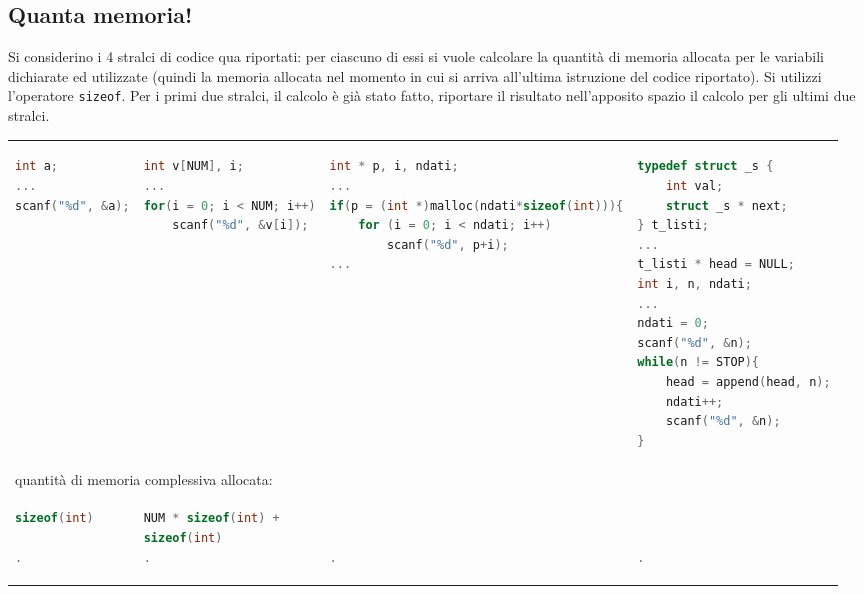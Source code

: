 \subsection{Quanta memoria!}
 Si considerino i 4 stralci di codice qua riportati: per ciascuno di essi si vuole calcolare la quantit\`a di memoria allocata per le variabili dichiarate ed utilizzate (quindi la memoria allocata nel momento in cui si arriva all'ultima istruzione del codice riportato). Si utilizzi l'operatore \texttt{sizeof}. Per i primi due stralci, il calcolo \`e gi\`a stato fatto, riportare il risultato nell'apposito spazio il calcolo per gli ultimi due stralci.

\small
\begin{tabular}{p{2.5cm}p{3.8cm}p{6.5cm}p{4.2cm}}
\begin{lstlisting}[language=c, tabsize=1]
int a;
...
scanf("%d", &a);
\end{lstlisting} &
\begin{lstlisting}[language=c, tabsize=1]
int v[NUM], i;
...
for(i = 0; i < NUM; i++)
	scanf("%d", &v[i]);
\end{lstlisting} &
\begin{lstlisting}[language=c, tabsize=1]
int * p, i, ndati;
...
if(p = (int *)malloc(ndati*sizeof(int))){
	for (i = 0; i < ndati; i++)
		scanf("%d", p+i);
...
\end{lstlisting} &
\begin{lstlisting}[language=c, tabsize=1]
typedef struct _s {
	int val;
	struct _s * next;
} t_listi;
...
t_listi * head = NULL;
int i, n, ndati;
...
ndati = 0;
scanf("%d", &n);
while(n != STOP){
	head = append(head, n);
	ndati++;
	scanf("%d", &n);
}

\end{lstlisting} \\
\multicolumn{4}{l}{quantit\`a di memoria complessiva allocata:}\\
\begin{lstlisting}[language=c, tabsize=1]
sizeof(int)
 
.
\end{lstlisting}
& \begin{lstlisting}[language=c, tabsize=1]
NUM * sizeof(int) + 
sizeof(int)
.
\end{lstlisting} & 
\begin{lstlisting}[language=c, tabsize=1]


.
\end{lstlisting} & 
\begin{lstlisting}[language=c, tabsize=1]


.
\end{lstlisting} \\
\end{tabular}

